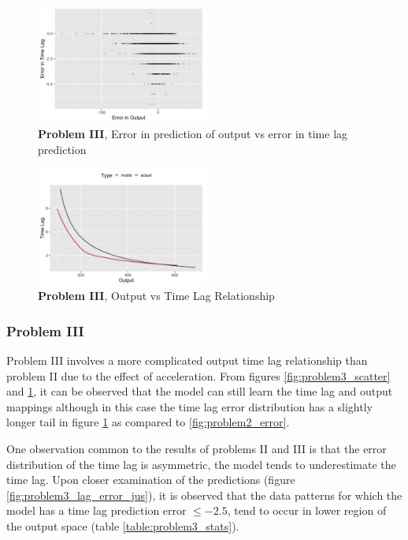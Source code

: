 \documentclass[twoside]{article}
\begin{document}
\begin{figure}[h]
\vspace{.3in}
\centerline{\includegraphics[width=0.5\textwidth]{figures/exp3_scatter_errors_test.png}}
\vspace{.3in}
\caption{\textbf{Problem III}, Error in prediction of output vs error in time lag prediction}
\label{fig:problem3_error}
\end{figure}

\begin{figure}[h]
\vspace{.3in}
\centerline{\includegraphics[width=0.5\textwidth]{figures/exp3_predictive_curves.png}}
\vspace{.3in}
\caption{\textbf{Problem III}, Output vs Time Lag Relationship}
\label{fig:problem3_curves}
\end{figure}


\subsubsection{Problem III}

Problem III involves a more complicated output time lag relationship than problem II due to the effect of acceleration. From figures \ref{fig:problem3_scatter} and \ref{fig:problem3_error}, it can be observed that the model can still learn the time lag and output mappings although in this case the time lag error distribution has a slightly longer tail in figure \ref{fig:problem3_error} as compared to \ref{fig:problem2_error}.

One observation common to the results of problems II and III is that the error distribution of the time lag is asymmetric, the model tends to underestimate the time lag. Upon closer examination of the predictions (figure \ref{fig:problem3_lag_error_jus}), it is observed that the data patterns for which the model has a time lag prediction error $\leq -2.5$, tend to occur in lower region of the output space (table \ref{table:problem3_stats}).
\end{document}
